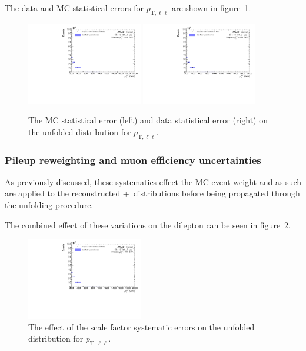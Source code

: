 The data and MC statistical errors for $p_{\text{T},\ell\ell}$ are shown in figure~\ref{fig:MCDataStatErr}.

\begin{figure}[h!]
  \centering
  \includegraphics[page=26,width=0.45\textwidth]{figures/unfoldErrPlots.pdf}
  \includegraphics[page=27,width=0.45\textwidth]{figures/unfoldErrPlots.pdf}
  \caption{The MC statistical error (left) and data statistical error (right) on the unfolded distribution for $p_{\text{T},\ell\ell}$.}
  \label{fig:MCDataStatErr}
\end{figure}

\subsubsection{Pileup reweighting and muon efficiency uncertainties}
As previously discussed, these systematics effect the MC event weight and as such are applied to the reconstructed \powheg+\pythia~distributions before being propagated through the unfolding procedure.

The combined effect of these variations on the dilepton \pt can be seen in figure~\ref{fig:SFSystErr}.

\begin{figure}[h!]
  \centering
  \includegraphics[page=22,width=0.45\textwidth]{figures/unfoldErrPlots.pdf}
  \caption{The effect of the scale factor systematic errors on the unfolded distribution for $p_{\text{T},\ell\ell}$.}
  \label{fig:SFSystErr}
\end{figure}

